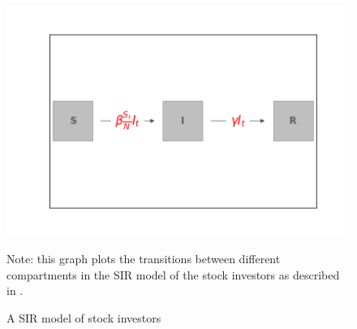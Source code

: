 \begin{figure}[!ht] \centering  %
	\caption{A SIR model of stock investors}
		\label{fig:sir_diagram}
		\centerline{\includegraphics[width=\textwidth]{./figures/flow_diagram.png}}
		\begin{flushleft}
		{\footnotesize Note: this graph plots the transitions between different compartments in the SIR model of the stock investors as described in \cite{shiller1989survey}. }
			\end{flushleft}
	\end{figure}


\newpage

